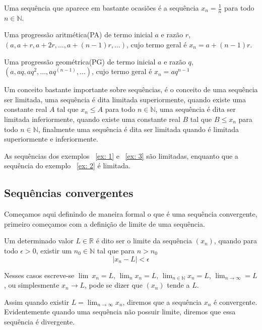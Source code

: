 \begin{ex}\label{ex: 3}
Uma sequência que aparece em bastante ocasiões é a sequência $x_n = \frac{1}{n}$
para todo $n \in \mathbb{N}$.
\end{ex}

\begin{ex}
Uma progressão aritmética(PA) de termo inicial $a$ e razão $r$,
$(a,a + r,a + 2r,\dots,a + (n-1)r, \dots)$, cujo termo geral é $x_n = a + (n-1)r$.
\end{ex}

\begin{ex}
Uma progressão geométrica(PG) de termo inicial $a$ e razão $q$,
$(a,aq,aq^2,\dots,aq^{(n-1)}, \dots)$, cujo termo geral é $x_n = aq^{n-1}$
\end{ex}

Um conceito bastante importante sobre sequências, é o conceito de uma sequência
ser limitada, uma sequência é dita limitada superiormente, quando existe uma 
constante real $A$ tal que $x_n\leq A$ para todo $n \in \mathbb{N}$, uma
sequência é dita ser limitada inferiormente, quando existe uma constante real 
$B$ tal que $B \leq x_n$ para todo $n \in \mathbb{N}$, finalmente uma sequência
é dita ser limitada quando é limitada superiormente e inferiormente.

As sequências dos exemplos ~\ref{ex: 1} e ~\ref{ex: 3} são limitadas, enquanto 
que a sequência do exemplo ~\ref{ex: 2} é limitada.

\subsection{Sequências convergentes}

Começamos aqui definindo de maneira formal o que é uma sequência convergente, 
primeiro começamos com a definição de limite de uma sequência.

Um determinado valor $L \in \mathbb{R}$ é dito ser o limite da sequência $(x_n)$,
quando para todo $\epsilon>0$, existir um $n_0 \in \mathbb{N}$ tal que para 
$n > n_0$
$$|x_n - L| < \epsilon$$

Nesses casos escreve-se $\lim_{\:} x_n = L$, $\lim_{n} x_n = L$,
$\lim_{n \in \mathbb{N}} x_n = L$, $\lim_{n \to \infty} = L$, ou 
simplesmente $x_n \to L$, pode se dizer que $(x_n)$ tende a $L$.

Assim quando existir $L = \lim_{n \to \infty} x_n$, diremos que a sequência $x_n$
é convergente. Evidentemente quando uma sequência não possuir limite, diremos 
que essa sequência é divergente.

